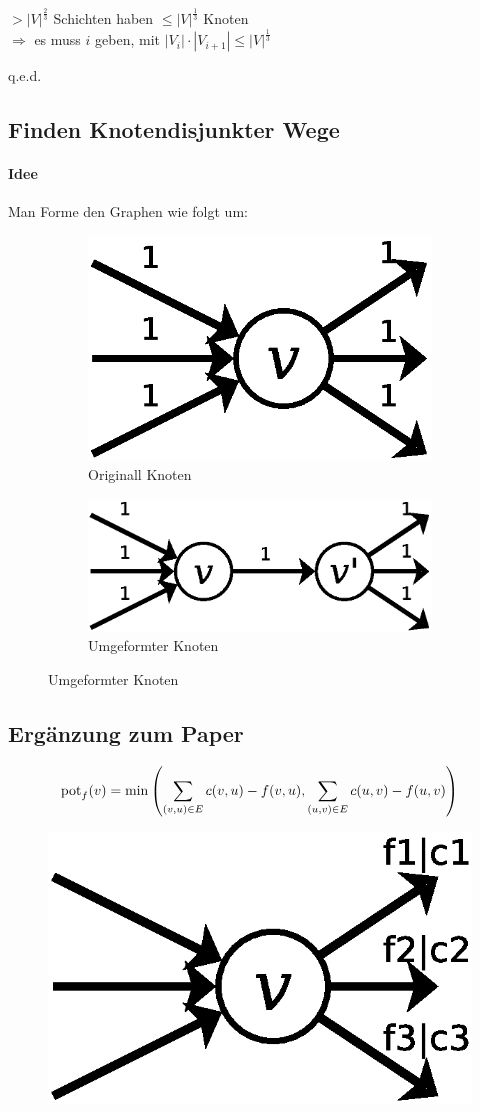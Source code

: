 $>|V|^\frac{2}{3}$ Schichten haben $\leq |V|^\frac{1}{3}$ Knoten\\
$\Rightarrow$ es muss $i$ geben, mit $|V_i|\cdot|V_{i+1}|\leq |V|^\frac{1}{3}$
\begin{flushright}
	q.e.d.
\end{flushright}
\subsection{Finden Knotendisjunkter Wege}
\paragraph{Idee} Man Forme den Graphen wie folgt um:
\begin{figure}[H]
\centering
\begin{subfigure}[H]{0.4\linewidth}
	\centering
\includegraphics[width=0.5\linewidth]{28/Grafik/Diagramm2}
\caption{Originall Knoten}
\label{fig:Diagramm2}
\end{subfigure}
\begin{subfigure}[H]{0.4\linewidth}
	\centering
	\includegraphics[width=\linewidth]{28/Grafik/Diagramm3}
	\caption{Umgeformter Knoten}
	\label{fig:Diagramm3}
\end{subfigure}
\end{figure}
\subsection{Ergänzung zum Paper}
\[ \text{pot}_f(v)=\min\left( \sum_{(v,u)\in E}c(v,u)-f(v,u),\sum_{(u,v)\in E}c(u,v)-f(u,v) \right) \]
\begin{figure}[h]
\centering
\includegraphics[width=0.2\linewidth]{28/Grafik/Diagramm4}
\caption{}
\label{fig:Diagramm4}
\end{figure}

